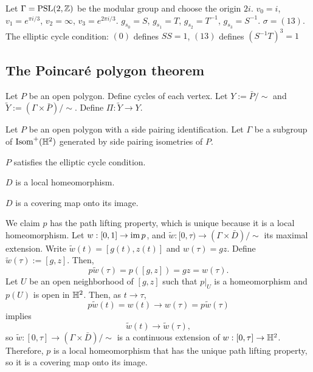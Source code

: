 \documentclass[12pt]{article}
\begin{document}
\begin{prb}

\end{prb}

\begin{prb}
Let $\Gamma=\mathrm{PSL}(2,\mathbb{Z})$ be the modular group and choose the origin $2i$.
$v_0=i$, $v_1=e^{\pi i/3}$, $v_2=\infty$, $v_3=e^{2\pi i/3}$.
$g_{s_0}=S$, $g_{s_1}=T$, $g_{s_2}=T^{-1}$, $g_{s_3}=S^{-1}$.
$\sigma=(13)$.
The elliptic cycle condition: $(0)$ defines $SS=1$, $(13)$ defines $(S^{-1}T)^3=1$

\end{prb}






\subsection{The Poincar\'e polygon theorem}


\begin{prb}
\begin{parts}
\item
\end{parts}
\end{prb}

\begin{prb}
Let $P$ be an open polygon.
Define cycles of each vertex.
Let $Y:=\bar P/\sim$ and $\tilde Y:=(\Gamma\times\bar P)/\sim$.
Define $\Pi:\tilde Y\to Y$.
\begin{parts}
\item
\end{parts}
\end{prb}


\begin{prb}
Let $P$ be an open polygon with a side pairing identification.
Let $\Gamma$ be a subgroup of $\operatorname{Isom}^+(\mathbb{H}^2)$ generated by side pairing isometries of $P$.
\begin{parts}
\item $P$ satisfies the elliptic cycle condition.
\item $D$ is a local homeomorphism.
\item $D$ is a covering map onto its image.
\end{parts}
\end{prb}
\begin{pf}
We claim $p$ has the path lifting property, which is unique because it is a local homeomorphism.
Let $w:[0,1]\to\operatorname{im} p$, and $\tilde w:[0,\tau)\to(\Gamma\times\bar D)/\sim$ its maximal extension.
Write $\tilde w(t)=[g(t),z(t)]$ and $w(\tau)=gz$.
Define $\tilde w(\tau):=[g,z]$.
Then,
\[p\tilde w(\tau)=p([g,z])=gz=w(\tau).\]
Let $U$ be an open neighborhood of $[g,z]$ such that $p|_U$ is a homeomorphism and $p(U)$ is open in $\mathbb{H}^2$.
Then, as $t\to\tau$,
\[p\tilde w(t)=w(t)\to w(\tau)=p\tilde w(\tau)\]
implies
\[\tilde w(t)\to\tilde w(\tau),\]
so $\tilde w:[0,\tau]\to(\Gamma\times\bar D)/\sim$ is a continuous extension of $w:[0,\tau]\to\mathbb{H}^2$.
Therefore, $p$ is a local homeomorphism that has the unique path lifting property, so it is a covering map onto its image.
\end{pf}
\end{document}
